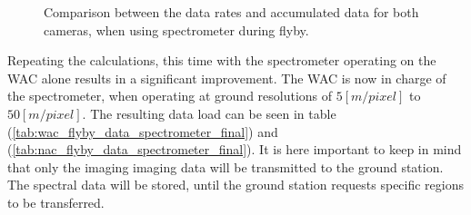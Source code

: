 \begin{figure}[htb]
    \centering
    \captionsetup[subfigure]{width=0.45\textwidth}
    \caption{Comparison between the data rates and accumulated data for both cameras, when using spectrometer during flyby.}\label{fig:data_gen_wac_nac_compare2}
\end{figure}
Repeating the calculations, this time with the spectrometer operating on the WAC alone results in a significant improvement. The WAC is now in charge of the spectrometer, when operating at ground resolutions of $5[m/pixel]$ to $50[m/pixel]$. The resulting data load can be seen in table (\ref{tab:wac_flyby_data_spectrometer_final}) and (\ref{tab:nac_flyby_data_spectrometer_final}). It is here important to keep in mind that only the imaging imaging data will be transmitted to the ground station. The spectral data will be stored, until the ground station requests specific regions to be transferred.
